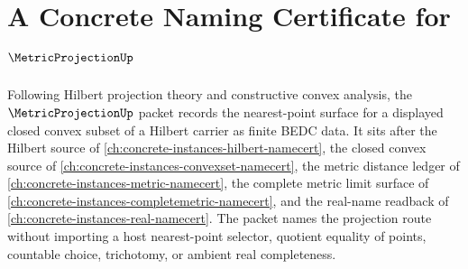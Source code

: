 \chapter{A Concrete Naming Certificate for $\MetricProjectionUp$}
\label{ch:concrete-instances-metricprojection-namecert}

Following Hilbert projection theory and constructive convex analysis, the $\MetricProjectionUp$ packet records the nearest-point surface for a displayed closed convex subset of a Hilbert carrier as finite BEDC data. It sits after the Hilbert source of \autoref{ch:concrete-instances-hilbert-namecert}, the closed convex source of \autoref{ch:concrete-instances-convexset-namecert}, the metric distance ledger of \autoref{ch:concrete-instances-metric-namecert}, the complete metric limit surface of \autoref{ch:concrete-instances-completemetric-namecert}, and the real-name readback of \autoref{ch:concrete-instances-real-namecert}. The packet names the projection route without importing a host nearest-point selector, quotient equality of points, countable choice, trichotomy, or ambient real completeness.

